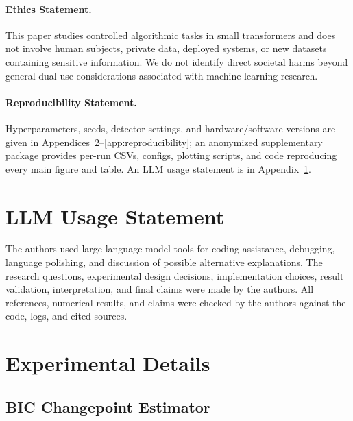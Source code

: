 \documentclass{article}
\begin{document}
\paragraph{Ethics Statement.}
This paper studies controlled algorithmic tasks in small
transformers and does not involve human subjects, private data,
deployed systems, or new datasets containing sensitive information.
We do not identify direct societal harms beyond general dual-use
considerations associated with machine learning research.

\paragraph{Reproducibility Statement.}
Hyperparameters, seeds, detector settings, and hardware/software
versions are given in
Appendices~\ref{app:details}--\ref{app:reproducibility};
an anonymized supplementary package provides per-run CSVs, configs,
plotting scripts, and code reproducing every main figure and table.
An LLM usage statement is in Appendix~\ref{app:llm_usage}.




\appendix

\section{LLM Usage Statement}
\label{app:llm_usage}

The authors used large language model tools for coding assistance,
debugging, language polishing, and discussion of possible
alternative explanations. The research questions, experimental
design decisions, implementation choices, result validation,
interpretation, and final claims were made by the authors. All
references, numerical results, and claims were checked by the
authors against the code, logs, and cited sources.

\section{Experimental Details}
\label{app:details}

\subsection{BIC Changepoint Estimator}
\end{document}
